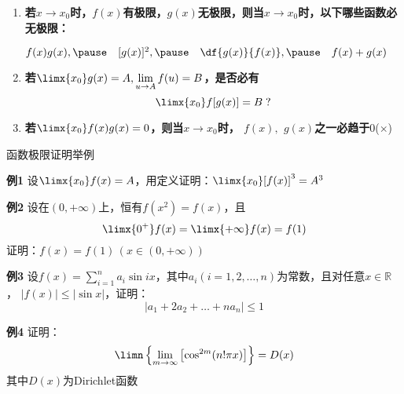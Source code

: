 \begin{frame}
	\linespread{1.5}
	\begin{enumerate}
	  \addtocounter{enumi}{1}\pause 
	  \item {\bf 若$x\to x_0$时，$f(x)$有极限，$g(x)$无极限，则当$x\to x_0$时，以下哪些函数必无极限：}\pause
	  \\
	  \centerline{$f(x)g(x),\pause \quad [g(x)]^2,\pause \quad
	  \df{g(x)}{f(x)},\pause \quad f(x)+g(x)$}\pause 
	  \item {\bf 若$\limx{x_0}g(x)=A,\lim\limits_{u\to
	  A}f(u)=B$，是否必有$$\limx{x_0}f[g(x)]=B\;?$$\pause }
	  \vspace{-2em}
	  \item {\bf 若$\limx{x_0}f(x)g(x)=0$，则当$x\to
	  x_0$时， $f(x),$ $g(x)$之一必趋于$0$}\;\pause (\alert{$\times$})
	\end{enumerate}
\end{frame}


\begin{frame}{函数极限证明举例}
	\linespread{1.2}\pause 
	\begin{exampleblock}{{\bf 例1}\hfill}
		设$\limx{x_0}f(x)=A$，用定义证明：$\limx{x_0}[f(x)]^3=A^3$
	\end{exampleblock}\pause 
	\bigskip
	\begin{exampleblock}{{\bf 例2}\hfill}
		设在$(0,+\infty)$上，恒有$f(x^2)=f(x)$，且
		$$\limx{0^+}f(x)=\limx{+\infty}f(x)=f(1)$$
		证明：$f(x)=f(1)\,(x\in(0,+\infty))$
	\end{exampleblock}
\end{frame}

\begin{frame}
	\linespread{1.2}\pause 
	\begin{exampleblock}{{\bf 例3}\hfill}
		设$f(x)=\sum\limits_{i=1}^na_i\sin
		ix$，其中$a_i(i=1,2,\ldots,n)$为常数，且对任意$x\in\mathbb{R}$， $|f(x)|\leq |\sin x|$，证明：
		$$\left|a_1+2a_2+\ldots+na_n\right|\leq 1$$
	\end{exampleblock}\pause 
	\begin{exampleblock}{{\bf 例4}\hfill}
		证明：$$\limn\left\{\lim\limits_{m\to\infty}\left[\cos^{2m}(n!\pi
		x)\right]\right\}=D(x)$$
		其中$D(x)$为Dirichlet函数
	\end{exampleblock}
\end{frame}

